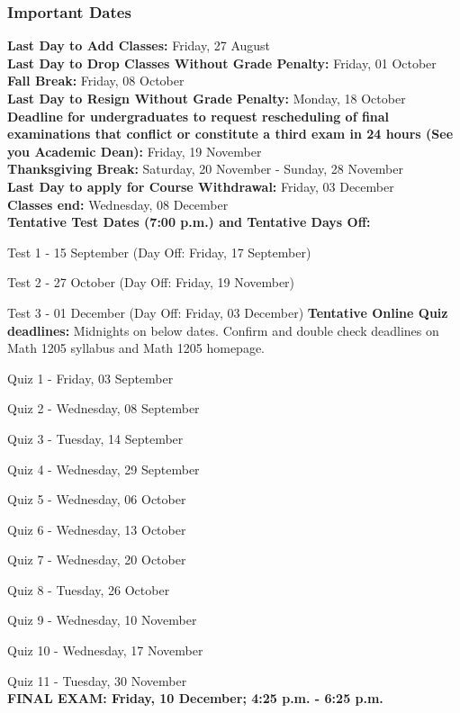 \documentclass{article}
\begin{document}
		\subsubsection*{Important Dates} 
			\textbf{Last Day to Add Classes:} Friday, 27 August \\
			\textbf{Last Day to Drop Classes Without Grade Penalty:} Friday, 01 October  \\
			\textbf{Fall Break:} Friday, 08 October  \\
			\textbf{Last Day to Resign Without Grade Penalty:} Monday, 18 October \\
			\textbf{Deadline for undergraduates to request rescheduling of final examinations that conflict or
			constitute a third exam in 24 hours (See you Academic Dean):} Friday, 19 November  \\
			\textbf{Thanksgiving Break:} Saturday, 20 November - Sunday, 28 November \\
			\textbf{Last Day to apply for Course Withdrawal:} Friday, 03 December  \\
			\textbf{Classes end:} Wednesday, 08 December  \\
			\textbf{Tentative Test Dates (7:00 p.m.) and Tentative Days Off:} 
				\par Test 1 - 15 September (Day Off: Friday, 17 September) 
				\par Test 2 - 27 October (Day Off: Friday, 19 November) 
				\par Test 3 - 01 December (Day Off: Friday, 03 December) 
			\textbf{Tentative Online Quiz deadlines:} Midnights on below dates.
			Confirm and double check deadlines on Math 1205 syllabus and Math 1205
			homepage.  
				\par Quiz 1 - Friday, 03 September 
				\par Quiz 2 - Wednesday, 08 September
				\par Quiz 3 - Tuesday, 14 September 
				\par Quiz 4 - Wednesday, 29 September 
				\par Quiz 5 - Wednesday, 06 October 
				\par Quiz 6 - Wednesday, 13 October
				\par Quiz 7 - Wednesday, 20 October
				\par Quiz 8 - Tuesday, 26 October 
				\par Quiz 9 - Wednesday, 10 November 
				\par Quiz 10 - Wednesday, 17 November 
				\par Quiz 11 - Tuesday, 30 November \\ 
			\textbf{FINAL EXAM: Friday, 10 December; 4:25 p.m. - 6:25 p.m.} 
\end{document}
